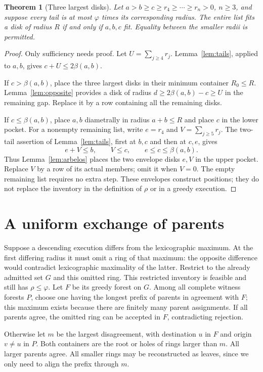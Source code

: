 \documentclass[11pt]{article}
\newtheorem{theorem}{Theorem}
\theoremstyle{remark}
\newcommand{\ph}{\varphi}
\newcommand{\bp}{\beta}
\begin{document}
\begin{theorem}[Three largest disks]\label{thm:three}
Let $a>b\ge c\ge r_4\ge\cdots\ge r_n>0$, $n\ge3$, and
suppose every tail is at most $\ph$ times its corresponding radius.
The entire list fits a disk of radius $R$ if and only if $a,b,c$ fit.
Equality between the smaller radii is permitted.
\end{theorem}
\begin{proof}
Only sufficiency needs proof. Let $U=\sum_{j\ge4}r_j$.
Lemma~\ref{lem:tails}, applied to $a,b$, gives
$c+U\le2\bp(a,b)$.

If $c>\bp(a,b)$, place the three largest disks in their minimum
container $R_0\le R$. Lemma~\ref{lem:opposite} provides a disk
of radius $d\ge2\bp(a,b)-c\ge U$ in the remaining gap. Replace
it by a row containing all the remaining disks.

If $c\le\bp(a,b)$, place $a,b$ diametrally in radius $a+b\le R$
and place $c$ in the lower pocket. For a nonempty remaining list,
write $e=r_4$ and $V=\sum_{j\ge5}r_j$. The two-tail assertion
of Lemma~\ref{lem:tails}, first at $b,c$ and then at $c,e$, gives
\[
 e+V\le b,\qquad V\le c,\qquad e\le c\le\bp(a,b).
\]
Thus Lemma~\ref{lem:arbelos} places the two envelope disks $e,V$
in the upper pocket. Replace $V$ by a row of its actual members;
omit it when $V=0$. The empty remaining list requires no extra step.
These envelopes construct positions; they do not replace the inventory
in the definition of $\rho$ or in a greedy execution.
\end{proof}

\section{A uniform exchange of parents}

Suppose a descending execution differs from the lexicographic maximum.
At the first differing radius it must omit a ring of that maximum:
the opposite difference would contradict lexicographic maximality of
the latter. Restrict to the already admitted set $G$ and this omitted ring.
This restricted inventory is feasible and still has $\rho\le\ph$.
Let $F$ be its greedy forest on $G$. Among all complete witness forests
$P$, choose one having the longest prefix of parents in agreement
with $F$; this maximum exists because there are finitely many parent
assignments. If all parents agree, the omitted ring can be accepted
in $F$, contradicting rejection.

Otherwise let $m$ be the largest disagreement, with destination $u$
in $F$ and origin $v\ne u$ in $P$. Both containers are the root or
holes of rings larger than $m$. All larger parents agree. All smaller
rings may be reconstructed as leaves, since we only need to align
the prefix through $m$.
\end{document}
